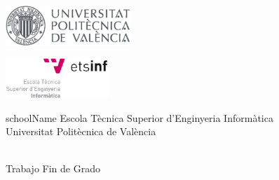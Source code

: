 \begin{titlepage}
	\begin{center}

		\pagestyle{empty}
		\BgThispage


		\begin{minipage}{0.49\linewidth}
			\begin{flushleft}
				\includegraphics[height=1.5cm]{frontpage/logo-upv}
			\end{flushleft}
		\end{minipage}
		\begin{minipage}{0.49\linewidth}
			\begin{flushright}
				\includegraphics[height=1.5cm]{frontpage/logo-etsinf}
			\end{flushright}
		\end{minipage}
		
		\vspace{2cm}
		
		
		\begin{color}{schoolName}
		\large
		Escola Tècnica Superior d'Enginyeria Informàtica\\[0.2cm]
		Universitat Politècnica de València\\[4cm]
		\end{color}
		
		
		{\LARGE \bfseries \titulo}\\[1.5cm]
		{\large Trabajo Fin de Grado}\\[0.4cm]
		\textbf{\textcolor{schoolName}{\large\titulacion}}\\[5.0cm]
		

\end{center}
\end{titlepage}
